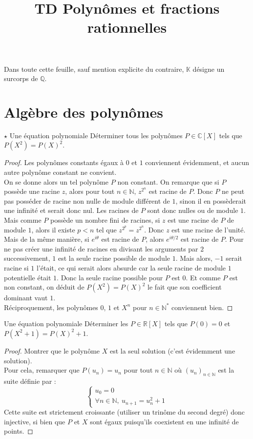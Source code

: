 \documentclass[french,a4paper]{article}
\title{TD Polynômes et fractions rationnelles}
\newcommand{\N}{\mathbb{N}}
\newcommand{\Q}{\mathbb{Q}}
\newcommand{\R}{\mathbb{R}}
\newcommand{\C}{\mathbb{C}}
\newcommand{\K}{\mathbb{K}}
\newcommand{\st}{^*}
\theoremstyle{plain}
\theoremstyle{definition}
\theoremstyle{remark}
\begin{document}
\maketitle

Dans toute cette feuille, sauf mention explicite du contraire, $\K$ désigne un surcorps de $\Q$.

\section{Algèbre des polynômes}

\begin{ex}{$\star$ Une équation polynomiale}
	Déterminer tous les polynômes $P\in\C[X]$ tels que $P(X^2)=P(X)^2$.
\end{ex}
\begin{proof}
	Les polynômes constants égaux à $0$ et $1$ conviennent évidemment, et aucun autre polynôme constant ne convient.\\ On se donne alors un tel polynôme $P$ non constant. On remarque que si $P$ possède une racine $z$, alors pour tout $n\in\N$, $z^{2^n}$ est racine de $P$. Donc $P$ ne peut pas posséder de racine non nulle de module différent de $1$, sinon il en possèderait une infinité et serait donc nul. Les racines de $P$ sont donc nulles ou de module $1$. Mais comme $P$ possède un nombre fini de racines, si $z$ est une racine de $P$ de module $1$, alors il existe $p<n$ tel que $z^{2^p}=z^{2^n}$. Donc $z$ est une racine de l'unité. Mais de la même manière, si $e^{i\theta}$ est racine de $P$, alors $e^{i\theta/2}$ est racine de $P$. Pour ne pas créer une infinité de racines en divisant les arguments par $2$ successivement, $1$ est la seule racine possible de module $1$. Mais alors, $-1$ serait racine si $1$ l'était, ce qui serait alors absurde car la seule racine de module $1$ potentielle était $1$. Donc la seule racine possible pour $P$ est $0$. Et comme $P$ est non constant, on déduit de $P(X^2)=P(X)^2$ le fait que son coefficient dominant vaut $1$. \\
	Réciproquement, les polynômes $0$, $1$ et $X^n$ pour $n\in\N\st$ conviennent bien.
\end{proof}

\begin{ex}{Une équation polynomiale}
	Déterminer les $P\in\R[X]$ tels que $P(0)=0$ et $P(X^2+1)=P(X)^2+1$.
\end{ex}
\begin{proof}
	Montrer que le polynôme $X$ est la seul solution (c'est évidemment une solution). \\
	Pour cela, remarquer que $P(u_n)=u_n$ pour tout $n\in\N$ où $(u_n)_{n\in\N}$ est la suite définie par : $$\begin{cases}
		u_0=0 \\
		\forall n\in\N,\ u_{n+1}=u_n^2+1
	\end{cases}$$ Cette suite est strictement croissante (utiliser un trinôme du second degré) donc injective, si bien que $P$ et $X$ sont égaux puisqu'ils coexistent en une infinité de points.
\end{proof}
\end{document}
